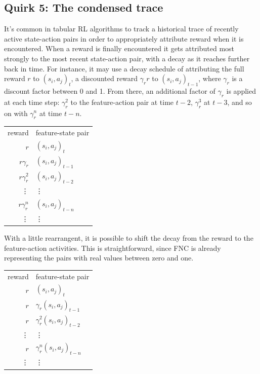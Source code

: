 \subsection*{Quirk 5: The condensed trace}
\label{algofeatureactiontrace}

It's common in tabular RL algorithms to track a historical trace of recently
active state-action pairs in order to appropriately attribute reward when it is
encountered. When a reward is finally encountered it gets attributed most
strongly to the most recent state-action pair, with a decay as it reaches
further back in time. For instance, it may use a decay schedule of
attributing the full reward $r$ to $(s_i, a_j)_t$, a discounted reward
$\gamma_r r$ to $(s_i, a_j)_{t-1}$, where $\gamma_r$ is a discount factor
between 0 and 1. From there, an additional factor of $\gamma_r$ is applied at
each time step: $\gamma_r^2$ to the feature-action pair at time $t-2$,
$\gamma_r^3$ at $t-3$, and so on with $\gamma_r^n$ at time $t-n$.

\begin{tabular}{r l}
    reward & feature-state pair\\
    $r$ & $(s_i, a_j)_t$\\ 
    $r \gamma_r$ & $(s_i, a_j)_{t-1}$\\ 
    $r \gamma_r^2$ & $(s_i, a_j)_{t-2}$\\ 
    \vdots & \vdots \\
    $r \gamma_r^n$ & $(s_i, a_j)_{t-n}$\\ 
    \vdots & \vdots \\
\end{tabular}

With a little rearrangent, it is possible to shift the decay from the
reward to the feature-action activities. This is straightforward,
since FNC is already representing the pairs with real values between zero
and one.

\begin{tabular}{r l}
    reward & feature-state pair\\
    $r$ & $(s_i, a_j)_t$\\ 
    $r$ & $\gamma_r (s_i, a_j)_{t-1}$\\ 
    $r$ & $\gamma_r^2 (s_i, a_j)_{t-2}$\\ 
    \vdots & \vdots \\
    $r$ & $\gamma_r^n (s_i, a_j)_{t-n}$\\ 
    \vdots & \vdots \\
\end{tabular}

